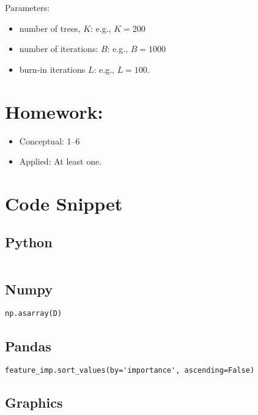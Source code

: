 \documentclass[
  letterpaper,
  DIV=11,
  numbers=noendperiod]{scrreprt}
\providecommand{\tightlist}{%
  \setlength{\itemsep}{0pt}\setlength{\parskip}{0pt}}\usepackage{longtable,booktabs,array}
\begin{document}
Parameters:

\begin{itemize}
\tightlist
\item
  number of trees, \(K\): e.g., \(K=200\)
\item
  number of iterations: \(B\): e.g., \(B=1000\)
\item
  burn-in iterations \(L\): e.g., \(L=100\).
\end{itemize}

\section{Homework:}\label{homework-4}

\begin{itemize}
\tightlist
\item
  Conceptual: 1--6
\item
  Applied: At least one.
\end{itemize}

\section{Code Snippet}\label{code-snippet-2}

\subsection{Python}\label{python-6}

\begin{verbatim}

\end{verbatim}

\subsection{Numpy}\label{numpy-6}

\begin{verbatim}
np.asarray(D)

\end{verbatim}

\subsection{Pandas}\label{pandas-6}

\begin{verbatim}
feature_imp.sort_values(by='importance', ascending=False)
\end{verbatim}

\subsection{Graphics}\label{graphics-6}
\end{document}
